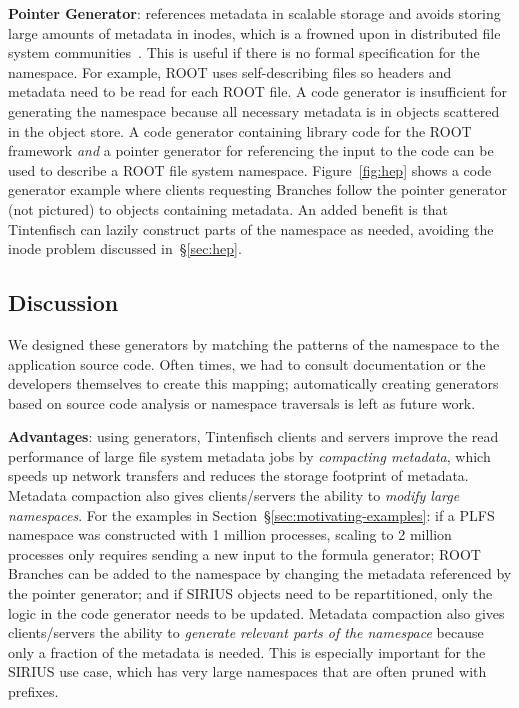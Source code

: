 \textbf{Pointer Generator}: references metadata in scalable storage and avoids
storing large amounts of metadata in inodes, which is a frowned upon in
distributed file system communities~\cite{docs:cephinternals}. This is useful
if there is no formal specification for the namespace. For example, ROOT uses
self-describing files so headers and metadata need to be read for each ROOT
file. A code generator is insufficient for generating the namespace because all
necessary metadata is in objects scattered in the object store.  A code
generator containing library code for the ROOT framework \emph{and} a pointer
generator for referencing the input to the code can be used to describe a ROOT
file system namespace.  Figure~\ref{fig:hep} shows a code generator example
where clients requesting Branches follow the pointer generator (not pictured)
to objects containing metadata. An added benefit is that Tintenfisch can lazily
construct parts of the namespace as needed, avoiding the inode problem
discussed in~\S\ref{sec:hep}.

\subsection{Discussion}

We designed these generators by matching the patterns of the namespace to the
application source code. Often times, we had to consult documentation or the
developers themselves to create this mapping; automatically creating generators
based on source code analysis or namespace traversals is left as future work.

\textbf{Advantages}: using generators, Tintenfisch clients and servers improve
the read performance of large file system metadata jobs by \emph{compacting
metadata}, which speeds up network transfers and reduces the storage footprint
of metadata. Metadata compaction also gives clients/servers the ability to
\emph{modify large namespaces}. For the examples in
Section~\S\ref{sec:motivating-examples}: if a PLFS namespace was constructed
with 1 million processes, scaling to 2 million processes only requires sending
a new input to the formula generator; ROOT Branches can be added to the
namespace by changing the metadata referenced by the pointer generator; and if
SIRIUS objects need to be repartitioned, only the logic in the code generator
needs to be updated. Metadata compaction also gives clients/servers the ability
to \emph{generate relevant parts of the namespace} because only a fraction of
the metadata is needed. This is especially important for the SIRIUS use case,
which has very large namespaces that are often pruned with prefixes.

